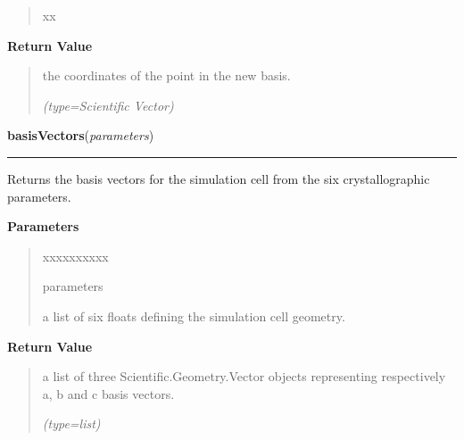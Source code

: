 \begin{boxedminipage}{\funcwidth}
\begin{quote}
\begin{Ventry}{xx}
        \end{Ventry}

      \end{quote}

      \textbf{Return Value}
    \vspace{-1ex}

      \begin{quote}
      the coordinates of the point in the new basis.

      {\it (type=Scientific Vector)}

      \end{quote}

    \end{boxedminipage}

    \label{nMOLDYN:Core:Mathematics:basisVectors}

    \vspace{0.5ex}

\hspace{.8\funcindent}\begin{boxedminipage}{\funcwidth}

    \raggedright \textbf{basisVectors}(\textit{parameters})

    \vspace{-1.5ex}

    \rule{\textwidth}{0.5\fboxrule}
\setlength{\parskip}{2ex}
    Returns the basis vectors for the simulation cell from the six 
    crystallographic parameters.

\setlength{\parskip}{1ex}
      \textbf{Parameters}
      \vspace{-1ex}

      \begin{quote}
        \begin{Ventry}{xxxxxxxxxx}

          \item[parameters]

          a list of six floats defining the simulation cell geometry.

        \end{Ventry}

      \end{quote}

      \textbf{Return Value}
    \vspace{-1ex}

      \begin{quote}
      a list of three Scientific.Geometry.Vector objects representing 
      respectively a, b and c basis vectors.

      {\it (type=list)}

      \end{quote}

    \end{boxedminipage}

